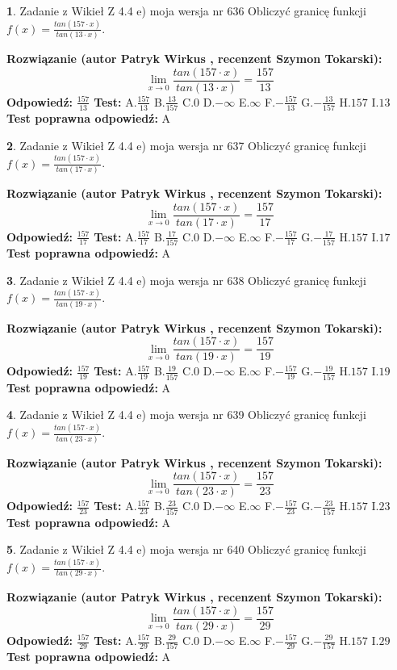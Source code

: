 \documentclass[12pt, a4paper]{article}
\theoremstyle{definition} %
\newtheorem{zad}{}
\newcommand{\zadStart}[1]{\begin{zad}#1\newline}
\newcommand{\zadStop}{\end{zad}}
\newcommand{\rozwStart}[2]{\noindent \textbf{Rozwiązanie (autor #1 , recenzent #2): }\newline}
\newcommand{\rozwStop}{\newline}
\newcommand{\odpStart}{\noindent \textbf{Odpowiedź:}\newline}
\newcommand{\odpStop}{\newline}
\newcommand{\testStart}{\noindent \textbf{Test:}\newline}
\newcommand{\testStop}{\newline}
\newcommand{\kluczStart}{\noindent \textbf{Test poprawna odpowiedź:}\newline}
\newcommand{\kluczStop}{\newline}
\begin{document}
\zadStart{Zadanie z Wikieł Z 4.4 e) moja wersja nr 636}
Obliczyć granicę funkcji $f(x)=\frac{tan(157\cdot x)}{tan(13\cdot x)}$.
\zadStop
\rozwStart{Patryk Wirkus}{Szymon Tokarski}
$$\lim\limits_{x\to 0}\frac{tan(157\cdot x)}{tan(13\cdot x)}=
\frac{157}{13}$$
\rozwStop
\odpStart
$\frac{157}{13}$
\odpStop
\testStart
A.$\frac{157}{13}$
B.$\frac{13}{157}$
C.$0$
D.$-\infty$
E.$\infty$
F.$-\frac{157}{13}$
G.$-\frac{13}{157}$
H.$157$
I.$13$
\testStop
\kluczStart
A
\kluczStop



\zadStart{Zadanie z Wikieł Z 4.4 e) moja wersja nr 637}
Obliczyć granicę funkcji $f(x)=\frac{tan(157\cdot x)}{tan(17\cdot x)}$.
\zadStop
\rozwStart{Patryk Wirkus}{Szymon Tokarski}
$$\lim\limits_{x\to 0}\frac{tan(157\cdot x)}{tan(17\cdot x)}=
\frac{157}{17}$$
\rozwStop
\odpStart
$\frac{157}{17}$
\odpStop
\testStart
A.$\frac{157}{17}$
B.$\frac{17}{157}$
C.$0$
D.$-\infty$
E.$\infty$
F.$-\frac{157}{17}$
G.$-\frac{17}{157}$
H.$157$
I.$17$
\testStop
\kluczStart
A
\kluczStop



\zadStart{Zadanie z Wikieł Z 4.4 e) moja wersja nr 638}
Obliczyć granicę funkcji $f(x)=\frac{tan(157\cdot x)}{tan(19\cdot x)}$.
\zadStop
\rozwStart{Patryk Wirkus}{Szymon Tokarski}
$$\lim\limits_{x\to 0}\frac{tan(157\cdot x)}{tan(19\cdot x)}=
\frac{157}{19}$$
\rozwStop
\odpStart
$\frac{157}{19}$
\odpStop
\testStart
A.$\frac{157}{19}$
B.$\frac{19}{157}$
C.$0$
D.$-\infty$
E.$\infty$
F.$-\frac{157}{19}$
G.$-\frac{19}{157}$
H.$157$
I.$19$
\testStop
\kluczStart
A
\kluczStop



\zadStart{Zadanie z Wikieł Z 4.4 e) moja wersja nr 639}
Obliczyć granicę funkcji $f(x)=\frac{tan(157\cdot x)}{tan(23\cdot x)}$.
\zadStop
\rozwStart{Patryk Wirkus}{Szymon Tokarski}
$$\lim\limits_{x\to 0}\frac{tan(157\cdot x)}{tan(23\cdot x)}=
\frac{157}{23}$$
\rozwStop
\odpStart
$\frac{157}{23}$
\odpStop
\testStart
A.$\frac{157}{23}$
B.$\frac{23}{157}$
C.$0$
D.$-\infty$
E.$\infty$
F.$-\frac{157}{23}$
G.$-\frac{23}{157}$
H.$157$
I.$23$
\testStop
\kluczStart
A
\kluczStop



\zadStart{Zadanie z Wikieł Z 4.4 e) moja wersja nr 640}
Obliczyć granicę funkcji $f(x)=\frac{tan(157\cdot x)}{tan(29\cdot x)}$.
\zadStop
\rozwStart{Patryk Wirkus}{Szymon Tokarski}
$$\lim\limits_{x\to 0}\frac{tan(157\cdot x)}{tan(29\cdot x)}=
\frac{157}{29}$$
\rozwStop
\odpStart
$\frac{157}{29}$
\odpStop
\testStart
A.$\frac{157}{29}$
B.$\frac{29}{157}$
C.$0$
D.$-\infty$
E.$\infty$
F.$-\frac{157}{29}$
G.$-\frac{29}{157}$
H.$157$
I.$29$
\testStop
\kluczStart
A
\kluczStop
\end{document}
